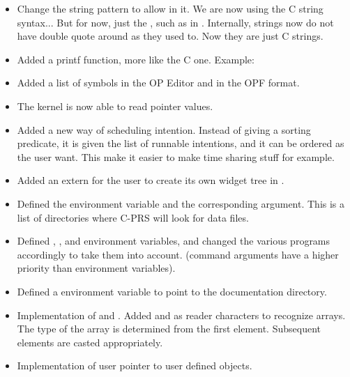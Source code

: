 \begin{itemize}

\item Change the string pattern to allow  in it. We are now using the C
string syntax... But for now, just the , such as in . Internally, strings now do not have double quote around as they
used to. Now they are just C strings.

\item Added a printf function, more like the C one. Example:\*

\item Added a list of symbols in the OP Editor and in the OPF format.

\item The kernel is now able to read pointer values.

\item Added a new way of scheduling intention. Instead of giving a
sorting predicate, it is given the list of runnable intentions, and it can be
ordered as the user want. This make it easier to make time sharing stuff for
example.

\item Added an extern  for the user
to create its own widget tree in \XPK{}.

\item Defined the  environment variable and the
corresponding  argument. This is a list of directories where C-PRS
will look for data files.

\item Defined , ,
 and  environment variables, and
changed the various programs accordingly to take them into account. (command
arguments have a higher priority than environment variables).

\item Defined a  environment variable to point to the
documentation directory.

\item  Implementation of  and . Added \samp{[} and \samp{]}
as reader characters to recognize arrays. The type of the array is determined
from the first element.  Subsequent elements are casted appropriately.

\item  Implementation of  user pointer to user defined objects.

\end{itemize}

